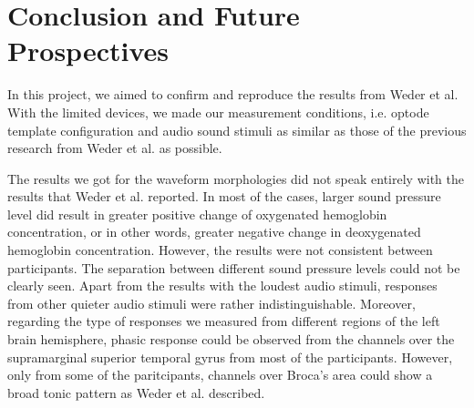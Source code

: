 \chapter{Conclusion and Future Prospectives}
In this project, we aimed to confirm and reproduce the results from Weder et al. With the limited devices, we made our measurement conditions, i.e. optode template configuration and audio sound stimuli as similar as those of the previous research from Weder et al. as possible.

The results we got for the waveform morphologies did not speak entirely with the results that Weder et al. reported. In most of the cases, larger sound pressure level did result in greater positive change of oxygenated hemoglobin concentration, or in other words, greater negative change in deoxygenated hemoglobin concentration. However, the results were not consistent between participants. The separation between different sound pressure levels could not be clearly seen. Apart from the results with the loudest audio stimuli, responses from other quieter audio stimuli were rather indistinguishable. Moreover, regarding the type of responses we measured from different regions of the left brain hemisphere, phasic response could be observed from the channels over the supramarginal superior temporal gyrus from most of the participants. However, only from some of the paritcipants, channels over Broca's area could show a broad tonic pattern as Weder et al. described.

